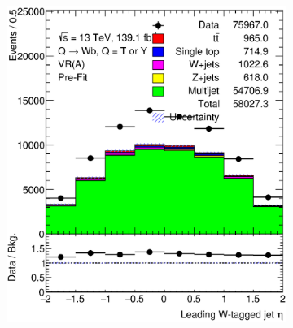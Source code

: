 \begin{figure}[hbt!]
\begin{subfigure}{.35\textwidth}
		\caption{}
		\label{fig:abcd:furtherimprovement:scaledcorr:jet_pt}
	\end{subfigure}
	\begin{subfigure}{.35\textwidth}
		\centering
		\includegraphics[width=\linewidth,height=\textheight,keepaspectratio]{VR_B_ljet_eta.eps}
		\caption{}
		\label{fig:abcd:furtherimprovement:scaledcorr:ljet_eta}
	\end{subfigure}\hspace{0.6cm}
	\begin{subfigure}{.35\textwidth}
		\centering

\end{subfigure}
\end{figure}
